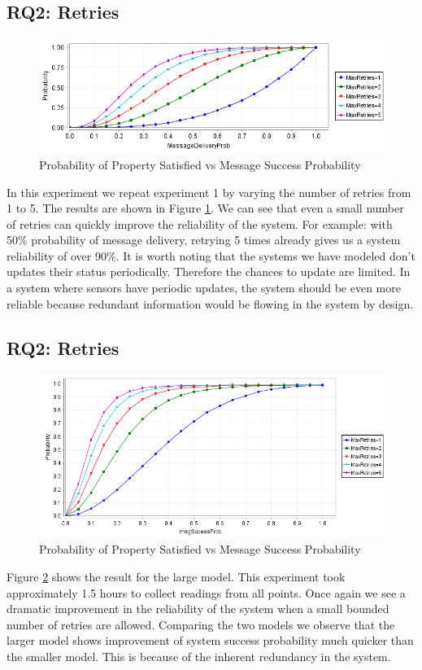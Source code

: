 \subsection{RQ2: Retries}
\begin{figure} 
  \includegraphics[width=\textwidth]{RQ2-small.png}
  \caption{Probability of Property Satisfied vs Message Success Probability}
  \label{RQ2-small}
\end{figure}

In this experiment we repeat experiment 1 by varying the number of retries from 1 to 5. The results are shown in Figure \ref{RQ2-small}. We can see that even a small number of retries can quickly improve the reliability of the system. For example: with 50\% probability of message delivery, retrying 5 times already gives us a system reliability of over 90\%. It is worth noting that the systems we have modeled don't updates their status periodically. Therefore the chances to update are limited. In a system where sensors have periodic updates, the system should be even more reliable because redundant information would be flowing in the system by design.

\subsection{RQ2: Retries}
\begin{figure} 
  \includegraphics[width=\textwidth]{RQ2-large.png}
  \caption{Probability of Property Satisfied vs Message Success Probability}
  \label{RQ2-large}
\end{figure}

Figure \ref{RQ2-large} shows the result for the large model. This experiment took approximately 1.5 hours to collect readings from all points. Once again we see a dramatic improvement in the reliability of the system when a small bounded number of retries are allowed. Comparing the two models we observe that the larger model shows improvement of system success probability much quicker than the smaller model. This is because of the inherent redundancy in the system.